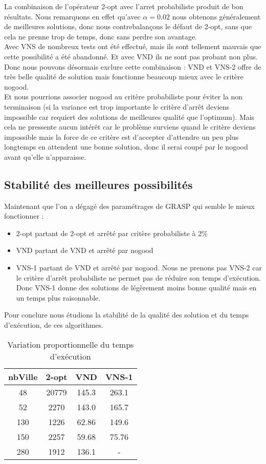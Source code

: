 \documentclass[12pt,a4paper]{article}
\begin{document}
La combinaison de l’opérateur 2-opt avec l'arret probabiliste produit de bon résultats. Nous remarquons en effet qu'avec $\alpha = 0.02$ nous obtenons généralement de meilleures solutions, donc nous contrebalançons le défaut de 2-opt, sans que cela ne prenne trop de temps, donc sans perdre son avantage.\\

Avec VNS de nombreux tests ont été effectué, mais ils sont tellement mauvais que cette possibilité a été abandonné. Et avec VND ils ne sont pas probant non plus. Donc nous pouvons désormais exclure cette combinaison : VND et VNS-2 offre de très belle qualité de solution mais fonctionne beaucoup mieux avec le critère nogood.\\
Et nous pourrions associer nogood au critère probabiliste pour éviter la non terminaison (si la variance est trop importante le critère d’arrêt deviens impossible car requiert des solutions de meilleures qualité que l'optimum). Mais cela ne pressente aucun intérêt car le problème surviens quand le critère deviens impossible mais la force de ce critère est d'accepter d'attendre un peu plus longtemps en attendent une bonne solution, donc il serai coupé par le nogood avant qu'elle n’apparaisse.\\

\subsection{Stabilité des meilleures possibilités}

Maintenant que l'on a dégagé des paramétrages de  GRASP qui semble le mieux fonctionner :
\begin{itemize}
\item
2-opt partant de 2-opt et arrêté par critère probabiliste à 2\%
\item
VND partant de VND et arrêté par nogood
\item
VNS-1 partant de VND et arrêté par nogood. Nous ne prenons pas VNS-2 car le critère d’arrêt probabiliste ne permet pas de réduire son temps d’exécution. Donc VNS-1 donne des solutions de légèrement moins bonne qualité mais en un temps plus raisonnable.
\end{itemize}
Pour conclure nous étudions la stabilité de la qualité des solution et du temps d’exécution, de ces algorithmes.\\

\begin{table}[!h]
\centering
\begin{tabular}{|*{4}{c|}}
  \hline
  nbVille & 2-opt & VND & VNS-1 \\
  \hline
  48 & 20779 & 145.3 & 263.1 \\
  52 & 2270 & 143.0 & 165.7 \\
  130 & 1226 & 62.86 & 149.6 \\
  150 & 2257 & 59.68 & 75.76 \\
  280 & 1912 & 136.1 & - \\
  \hline
\end{tabular}
\caption{Variation proportionnelle du temps d’exécution}
\label{varsolGRASP}
\end{table}
\end{document}

